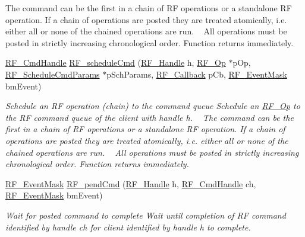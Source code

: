 \begin{DoxyCompactItemize}
\begin{DoxyCompactList}
 The command can be the first in a chain of R\+F operations or a standalone R\+F operation. If a chain of operations are posted they are treated atomically, i.\+e. either all or none of the chained operations are run. ~\newline
 All operations must be posted in strictly increasing chronological order. Function returns immediately. ~\newline
 \end{DoxyCompactList}\item 
\hyperlink{_r_f_8h_acab1f56c62a9fd1ad0a91a46b6da23f1}{R\+F\+\_\+\+Cmd\+Handle} \hyperlink{_r_f_8h_a5e7f25943b5f3942bf4c09cb87f9aa76}{R\+F\+\_\+schedule\+Cmd} (\hyperlink{_r_f_8h_a5e8ab7fc87fb818f435d9b6226ee573f}{R\+F\+\_\+\+Handle} h, \hyperlink{_r_f_8h_a47ea3dea78019340e8f8ceb854de5f02}{R\+F\+\_\+\+Op} $\ast$p\+Op, \hyperlink{struct_r_f___schedule_cmd_params}{R\+F\+\_\+\+Schedule\+Cmd\+Params} $\ast$p\+Sch\+Params, \hyperlink{_r_f_8h_a4d2ce6dc70b0f329dc5e249ec10c574a}{R\+F\+\_\+\+Callback} p\+Cb, \hyperlink{_r_f_8h_a128c46e18dbbaa781abb7abafc35233a}{R\+F\+\_\+\+Event\+Mask} bm\+Event)
\begin{DoxyCompactList}\small\item\em Schedule an R\+F operation (chain) to the command queue Schedule an \hyperlink{_r_f_8h_a47ea3dea78019340e8f8ceb854de5f02}{R\+F\+\_\+\+Op} to the R\+F command queue of the client with handle h. ~\newline
 The command can be the first in a chain of R\+F operations or a standalone R\+F operation. If a chain of operations are posted they are treated atomically, i.\+e. either all or none of the chained operations are run. ~\newline
 All operations must be posted in strictly increasing chronological order. Function returns immediately. ~\newline
 \end{DoxyCompactList}\item 
\hyperlink{_r_f_8h_a128c46e18dbbaa781abb7abafc35233a}{R\+F\+\_\+\+Event\+Mask} \hyperlink{_r_f_8h_a91c1cb2508311f822acbc08ace568a83}{R\+F\+\_\+pend\+Cmd} (\hyperlink{_r_f_8h_a5e8ab7fc87fb818f435d9b6226ee573f}{R\+F\+\_\+\+Handle} h, \hyperlink{_r_f_8h_acab1f56c62a9fd1ad0a91a46b6da23f1}{R\+F\+\_\+\+Cmd\+Handle} ch, \hyperlink{_r_f_8h_a128c46e18dbbaa781abb7abafc35233a}{R\+F\+\_\+\+Event\+Mask} bm\+Event)
\begin{DoxyCompactList}\small\item\em Wait for posted command to complete Wait until completion of R\+F command identified by handle ch for client identified by handle h to complete. ~\newline

\end{DoxyCompactList}
\end{DoxyCompactItemize}
